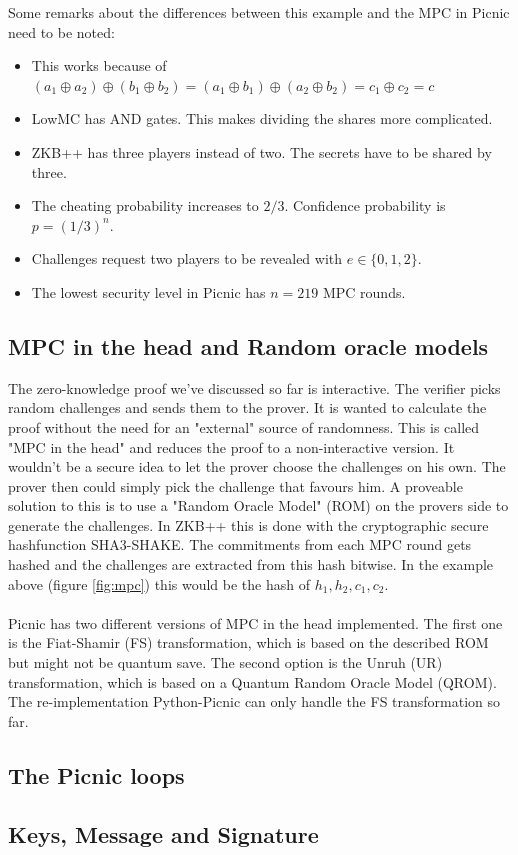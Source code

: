 \documentclass[]{article}
\begin{document}
Some remarks about the differences between this example and the MPC in Picnic need to be noted:
\begin{itemize}
\item{This works because of $(a_1 \oplus a_2) \oplus (b_1 \oplus b_2) = (a_1 \oplus b_1) \oplus (a_2 \oplus b_2) = c_1 \oplus c_2 = c$}
\item{LowMC has AND gates. This makes dividing the shares more complicated.}
\item{ZKB++ has three players instead of two. The secrets have to be shared by three.}
\item{The cheating probability increases to $2/3$. Confidence probability is $p=(1/3)^n$.}
\item{Challenges request two players to be revealed with $e \in \{0,1,2\}$.}
\item{The lowest security level in Picnic has $n = 219$ MPC rounds.}
\end{itemize} 
\subsection{MPC in the head and Random oracle models}
The zero-knowledge proof we've discussed so far is interactive. The verifier picks random challenges and sends them to the prover. It is wanted to calculate the proof without the need for an "external" source of randomness. This is called "MPC in the head" and reduces the proof to a non-interactive version. It wouldn't be a secure idea to let the prover choose the challenges on his own. The prover then could simply pick the challenge that favours him. A proveable solution to this is to use a "Random Oracle Model" (ROM) on the provers side to generate the challenges. In ZKB++ this is done with the cryptographic secure hashfunction SHA3-SHAKE. The commitments from each MPC round gets hashed and the challenges are extracted from this hash bitwise. In the example above (figure \ref{fig:mpc}) this would be the hash of $h_1, h_2, c_1, c_2$.\\ \\
Picnic has two different versions of MPC in the head implemented. The first one is the Fiat-Shamir (FS) transformation, which is based on the described ROM but might not be quantum save. The second option is the Unruh (UR) transformation, which is based on a Quantum Random Oracle Model (QROM). The re-implementation Python-Picnic can only handle the FS transformation so far. 
\subsection{The Picnic loops}
\subsection{Keys, Message and Signature}


\end{document}
